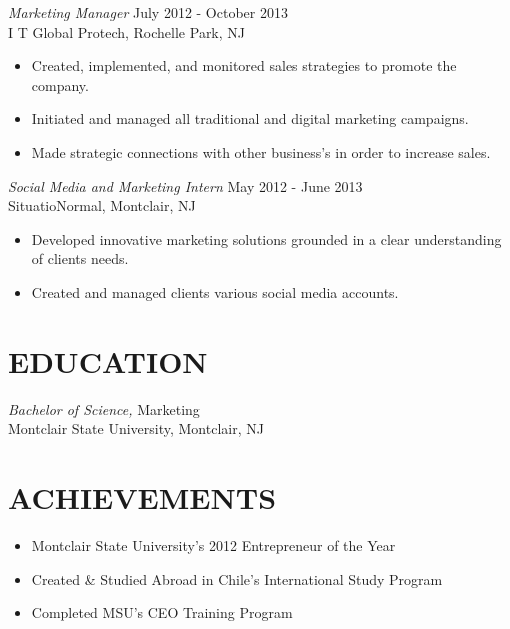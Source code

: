 \documentclass[margin]{res}
\begin{document}
\begin{resume}
                {\sl Marketing Manager} \hfill July 2012 - October 2013 \\
                I T Global Protech, Rochelle Park, NJ
                 \begin{itemize}  \itemsep -2pt %
                 \item Created, implemented, and monitored sales strategies to promote the company.
                 \item Initiated and managed all traditional and digital marketing campaigns.
                 \item Made strategic connections with other business's in order to increase sales.
                 \end{itemize}
                 
               {\sl Social Media and Marketing Intern} \hfill            May 2012 - June 2013 \\
                SituatioNormal, Montclair, NJ
                 \begin{itemize}  \itemsep -2pt %
                 \item Developed innovative marketing solutions grounded in a clear understanding of clients needs.
                 \item Created and managed clients various social media accounts.
                 \end{itemize} 
 
\section{EDUCATION} {\sl Bachelor of Science,} Marketing \\
                Montclair State University, Montclair, NJ \vspace{0.1pt}
\section{ACHIEVEMENTS}
\begin{itemize} 
		\item Montclair State University's 2012 Entrepreneur of the Year
		\item Created \& Studied Abroad in Chile's International Study Program
		\item Completed MSU's CEO Training Program 
					                
					                 
\end{itemize}

\end{resume}
\end{document}
